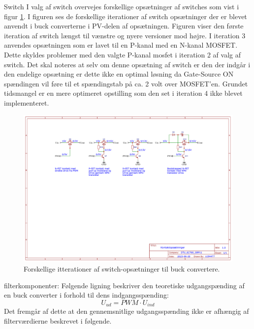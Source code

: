 \documentclass[../main.tex]{subfiles}
\begin{document}
            
            Switch
            I valg af switch overvejes forskellige opsætninger af switches som vist i figur \ref{fig: Switch designs}. I figuren ses de forskellige iterationer af switch opsætninger der er blevet anvendt i buck converterne i PV-delen af opsætningen. Figuren viser den første iteration af switch længst til vænstre og nyere versioner mod højre.
            \newline
            I iteration 3 anvendes opsætningen som er lavet til en P-kanal med en N-kanal MOSFET. Dette skyldes problemer med den valgte P-kanal mosfet i iteration 2 af valg af switch. Det skal noteres at selv om denne opsætning af switch er den der indgår i den endelige opsætning er dette ikke en optimal løsning da Gate-Source ON spændingen vil føre til et spændingstab på ca. 2 volt over MOSFET'en. Grundet tidsmangel er en mere optimeret opstilling som den set i iteration 4 ikke blevet implementeret.\newline
            
            \begin{figure}[H]
            \includegraphics[width=\textwidth]{Dokumentation/Figures/PV_Converter switches.png}
            \caption{Forskellige itterationer af switch-opsætninger til buck convertere.}
            \label{fig: Switch designs}
            \end{figure}
            
            filterkomponenter:
                Følgende ligning beskriver den teoretiske udgangspænding af en buck converter i forhold til dens indgangsspænding:\newline
                $$U_{ud} = PWM \cdot U_{ind} $$\newline
                Det fremgår af dette at den gennemsnitlige udgangsspænding ikke er afhængig af filterværdierne beskrevet i følgende.
            
\end{document}
